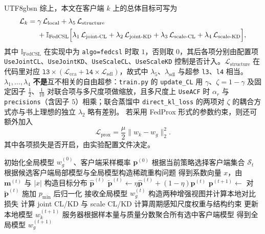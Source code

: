 \documentclass{article}
\begin{document}
\begin{CJK*}{UTF8}{gbsn}
综上，本文在客户端 $k$ 上的总体目标可写为
\begin{equation}
\begin{aligned}
\mathcal{L}_k ={}& \gamma\,\mathcal{L}_{\text{local}}
+ \lambda_5\,\mathcal{L}_{\text{structure}} \\
&+ \mathbb{I}_{\text{FedCSL}}\Bigl[
\lambda_1\,\mathcal{L}_{\text{joint-CL}}
+ \lambda_2\,\mathcal{L}_{\text{joint-KD}}
+ \lambda_3\,\mathcal{L}_{\text{scale-CL}}
+ \lambda_4\,\mathcal{L}_{\text{scale-KD}}
\Bigr],
\end{aligned}
\end{equation}
其中 $\mathbb{I}_{\text{FedCSL}}$ 在实现中为 \texttt{algo=fedcsl} 时取 $1$，否则取 $0$，其后各项分别由配置项 \texttt{UseJointCL}、\texttt{UseJointKD}、\texttt{UseScaleCL}、\texttt{UseScaleKD} 控制是否计入。$\mathcal{L}_{\text{structure}}$ 在代码里对应 $\texttt{l3}\times(\mathcal{L}_{\text{cca}}+\texttt{l4}\times\mathcal{L}_{\text{sdl}})$，故式中 $\lambda_5$、$\lambda_{\text{sdl}}$ 与超参 \texttt{l3}、\texttt{l4} 相当。$\lambda_1,\ldots,\lambda_4$ \textbf{不是}互不相关的自由超参：\texttt{train.py} 的 \texttt{update\_CL} 用 $\gamma$、$\zeta=1-\gamma$ 及固定因子 $\frac12$、$\frac{1}{10}$ 对联合项与多尺度项做缩放，且多尺度上 \texttt{UseACF} 时 $\alpha_r$ 与 \texttt{precisions}（含因子 $5$）相乘；联合蒸馏中 \texttt{direct\_kl\_loss} 的两项对 $\zeta$ 的耦合方式亦与书上理想的独立 $\lambda_2$ 略有差别。
若采用 FedProx 形式的参数约束，则还可额外加入
\begin{equation}
\mathcal{L}_{\text{prox}} = \frac{\mu}{2}\|w_k-w_g\|_2^2.
\end{equation}
其中各项损失是否开启，由实验配置文件决定。

\begin{algorithm}[H]
\caption{FedCSL 训练流程}
\label{alg:fedcsl}
\begin{algorithmic}[1]
\State 初始化全局模型 $w_g^{(0)}$、客户端采样概率 $\bm{p}^{(0)}$
    \State 根据当前策略选择客户端集合 $\mathcal{S}_t$
        \State 根据候选客户端局部模型与全局模型构造稀疏重构问题
        \State 得到系数向量 $x$，由 $\bm{m}^{(t)}$ 与 $|x|$ 构造目标分布 $\hat{\bm{p}}^{(t)}$
        \State $\tilde{\bm{p}}^{(t)}\leftarrow \eta\hat{\bm{p}}^{(t)}+(1-\eta)\bm{p}^{(t)}$ 
        \State $\bm{p}^{(t+1)}\leftarrow$ 对 $\tilde{\bm{p}}^{(t)}$ 施加 $p_{\min}$ 后归一化
    \EndIf
        \State 接收全局模型 $w_g^{(t)}$
        \State 构造两种增强视图并计算本地对比损失
        \State 计算 joint CL/KD 与 scale CL/KD
        \State 计算周期感知尺度权重与结构约束
        \State 更新本地模型 $w_k^{(t+1)}$
    \EndFor
    \State 服务器根据样本量与质量分数聚合所有选中客户端模型
    \State 得到全局模型 $w_g^{(t+1)}$
\EndFor
\end{algorithmic}
\end{algorithm}


\end{CJK*}
\end{document}
